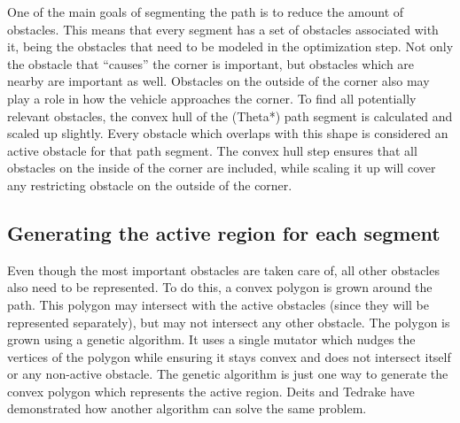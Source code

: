 One of the main goals of segmenting the path is to reduce the amount of obstacles. This means that every segment has a set of obstacles associated with it, being the obstacles that need to be modeled in the optimization step. Not only the obstacle that ``causes'' the corner is important, but obstacles which are nearby are important as well. Obstacles on the outside of the corner also may play a role in how the vehicle approaches the corner. To find all potentially relevant obstacles, the convex hull of the (Theta*) path segment is calculated and scaled up slightly. Every obstacle which overlaps with this shape is considered an active obstacle for that path segment. The convex hull step ensures that all obstacles on the inside of the corner are included, while scaling it up will cover any restricting obstacle on the outside of the corner.
\subsection{Generating the active region for each segment}
Even though the most important obstacles are taken care of, all other obstacles also need to be represented. To do this, a convex polygon is grown around the path. This polygon may intersect with the active obstacles (since they will be represented separately), but may not intersect any other obstacle. The polygon is grown using a genetic algorithm. It uses a single mutator which nudges the vertices of the polygon while ensuring it stays convex and does not intersect itself or any non-active obstacle. The genetic algorithm is just one way to generate the convex polygon which represents the active region. Deits and Tedrake\cite{Deits2015} have demonstrated how another algorithm can solve the same problem.

